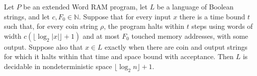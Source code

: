 \begin{theorem}
\label{WordRAM.mem_NL_of_accepts}
\leanok
{}
Let $P$ be an extended Word RAM program, let $L$ be a language of Boolean strings, and
let $c,F_0\in\mathbb{N}$. Suppose that for every input $x$ there is a time bound $t$
such that, for every coin string $\rho$, the program halts within $t$ steps using words
of width $c(\lfloor\log_2 |x|\rfloor+1)$ and at most $F_0$ touched memory addresses,
with some output. Suppose also that $x\in L$ exactly when there are coin and output
strings for which it halts within that time and space bound with acceptance. Then $L$ is
decidable in nondeterministic space $\lfloor\log_2 n\rfloor+1$.
\end{theorem}
